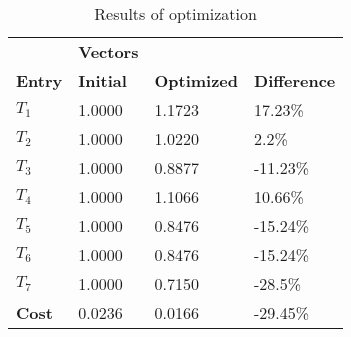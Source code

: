 \begin{table}[H]
\centering
\begin{tabular}{llll}
\textbf{}      & \cellcolor[HTML]{EFEFEF}\textbf{Vectors} & \textbf{} & \textbf{}         \\
\rowcolor[HTML]{EFEFEF} 
\textbf{Entry} & \textbf{Initial} & \textbf{Optimized} & \textbf{Difference} \\
$T_1$ & 1.0000 & 1.1723 & 17.23\% \\ 
$T_2$ & 1.0000 & 1.0220 & 2.2\% \\ 
$T_3$ & 1.0000 & 0.8877 & -11.23\% \\ 
$T_4$ & 1.0000 & 1.1066 & 10.66\% \\ 
$T_5$ & 1.0000 & 0.8476 & -15.24\% \\ 
$T_6$ & 1.0000 & 0.8476 & -15.24\% \\ 
$T_7$ & 1.0000 & 0.7150 & -28.5\% \\ 
\rowcolor[HTML]{EFEFEF} 
\textbf{Cost}  & 0.0236 & 0.0166 & -29.45\% \\ 
\end{tabular}
\caption{Results of optimization}
\label{tab:OptimizationAnalysis}
\end{table}